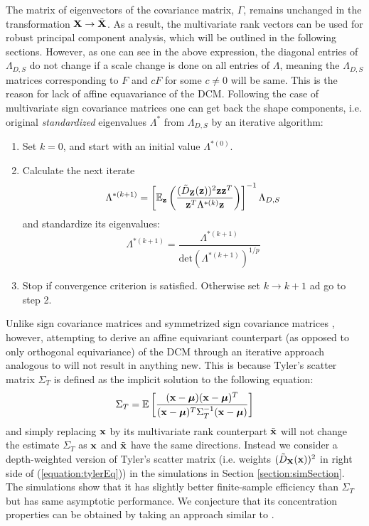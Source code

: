 \documentclass[10pt]{book}
\begin{document}
The matrix of eigenvectors of the covariance matrix, $\Gamma$, remains unchanged in the transformation ${\mathbf{X}} \rightarrow \tilde {{\mathbf{X}}}$. As a result, the multivariate rank vectors can be used for robust principal component analysis, which will be outlined in the following sections. However, as one can see in the above expression, the diagonal entries of $\Lambda_{D,S}$ do not change if a scale change is done on all entries of $\Lambda$, meaning the $\Lambda_{D,S}$ matrices corresponding to $F$ and $cF$ for some $c \neq 0$ will be same. This is the reason for lack of affine equavariance of the DCM. Following the case of multivariate sign covariance matrices \citep{taskinen12} one can get back the shape components, i.e. original \textit{standardized} eigenvalues $\Lambda^*$ from $\Lambda_{D,S}$ by an iterative algorithm:

\begin{enumerate}
\item Set $k=0$, and start with an initial value $\Lambda^{*(0)}$.

\item Calculate the next iterate
%
$$ \Lambda^{*(k+1)} = \left[ \mathbb E_{\bf{z}} \left( \frac{(\tilde D_{\mathbf{Z}}({\bf{z}}))^2 {\bf{z}} {\bf{z}}^T}{{\bf{z}}^T \Lambda^{*(k)} {\bf{z}}} \right) \right]^{-1} \Lambda_{D,S} $$
and standardize its eigenvalues:
%
$$ \Lambda^{*(k+1)} = \frac{\Lambda^{*(k+1)}}{\text{det} (\Lambda^{*(k+1)})^{1/p}} $$
%
\item Stop if convergence criterion is satisfied. Otherwise set $k \rightarrow k+1$ ad go to step 2.
\end{enumerate}

Unlike sign covariance matrices and symmetrized sign covariance matrices \citep{dumbgen98}, however, attempting to derive an affine equivariant counterpart (as opposed to only orthogonal equivariance) of the DCM through an iterative approach analogous to \cite{tyler87} will not result in anything new. This is because Tyler's scatter matrix $\Sigma_T$ is defined as the implicit solution to the following equation:
%
\begin{equation} \label{equation:tylerEq}
\Sigma_T = \mathbb E\left[ \frac{({\bf{x}} - {\boldsymbol{\mu}}) ({\bf{x}} - {\boldsymbol{\mu}})^T}{({\bf{x}} - {\boldsymbol{\mu}})^T \Sigma_T^{-1} ({\bf{x}} - {\boldsymbol{\mu}})} \right]
\end{equation}
%
and simply replacing ${\bf{x}}$ by its multivariate rank counterpart $\tilde{{\bf{x}}}$ will not change the estimate $\Sigma_T$ as ${\bf{x}}$ and $\tilde {{\bf{x}}}$ have the same directions. Instead we consider a depth-weighted version of Tyler's scatter matrix (i.e. weights $(\tilde D_{\mathbf{X}}({\bf{x}}))^2$ in right side of (\ref{equation:tylerEq})) in the simulations in Section \ref{section:simSection}. The simulations show that it has slightly better finite-sample efficiency than $\Sigma_T$ but has same asymptotic performance. We conjecture that its concentration properties can be obtained by taking an approach similar to \cite{soloveychik14}.
\end{document}

